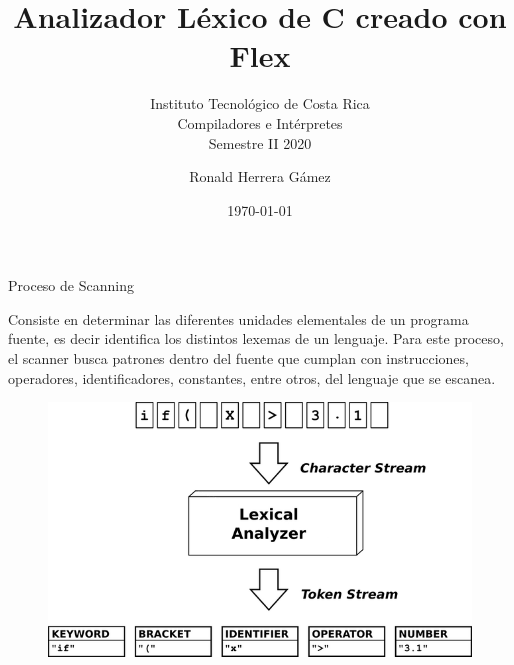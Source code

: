 \documentclass[compress]{beamer}
\title{Analizador Léxico de C creado con Flex}
\subtitle{Instituto Tecnológico de Costa Rica \\Compiladores e Intérpretes \\Semestre II 2020}
\author{Ronald Herrera Gámez}
\date{\today}
\begin{document}
\begin{frame}
  \maketitle
\end{frame}

\begin{frame}{Proceso de Scanning}

    \justifying
    Consiste en determinar las diferentes unidades elementales de un programa fuente, es decir identifica los distintos lexemas de un lenguaje. Para este proceso, el scanner busca patrones dentro del fuente que cumplan con instrucciones, operadores, identificadores, constantes, entre otros, del lenguaje que se escanea.
    
    \begin{figure}
        \centering
        \includegraphics[scale=1.2]{images/scanning.png}
    \end{figure}

\end{frame}
\end{document}
